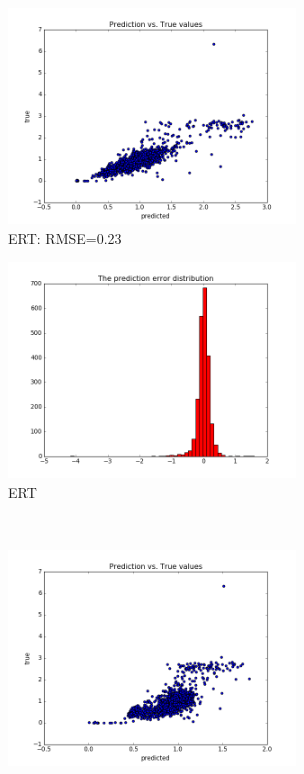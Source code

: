\documentclass{article}
\begin{document}
\begin{figure}[ht]
  \hspace*{-4cm}
  \begin{subfigure}[b]{\linewidth}
    \centering
    \includegraphics[width=3in]{1ERT_true_vs_predicted_RMSE_023}
    \caption{ERT: RMSE=0.23}\label{fig:2a}
  \end{subfigure}%
  \hspace*{-4cm}
  \begin{subfigure}[b]{\linewidth}
    \centering
    \includegraphics[width=3in]{1ERT_error_histogram_RMSE_023}
    \caption{ERT}\label{fig:2b}
  \end{subfigure}%
  \\
  \hspace*{-4cm}
  \begin{subfigure}[b]{\linewidth}
    \centering
    \includegraphics[width=3in]{1LRERT_true_vs_predicted_RMSE_036}

\end{subfigure}
\end{figure}
\end{document}
